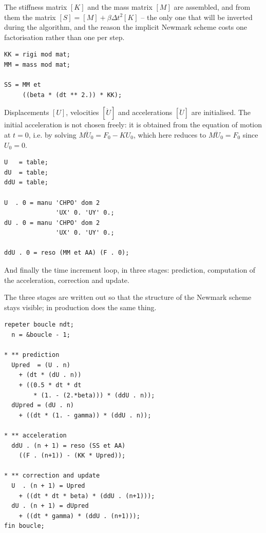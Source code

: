 \begin{castemcom}
The stiffness matrix $[K]$ and the mass matrix $[M]$ are assembled, and from
them the matrix $[S]=[M]+\beta\Delta t^{2}[K]$ -- the only one that will be
inverted during the algorithm, and the reason the implicit Newmark scheme
costs one factorisation rather than one per step.
\end{castemcom}
\begin{castemlines}
\begin{verbatim}
KK = rigi mod mat;
MM = mass mod mat;

SS = MM et
     ((beta * (dt ** 2.)) * KK);
\end{verbatim}
\end{castemlines}

\begin{castemcom}
Displacements $[U]$, velocities $[\dot{U}]$ and accelerations $[\ddot{U}]$ are
initialised. The initial acceleration is not chosen freely: it is obtained
from the equation of motion at $t=0$, i.e. by solving
$M\ddot{U}_0 = F_0 - K U_0$, which here reduces to $M\ddot{U}_0 = F_0$ since
$U_0=0$.
\end{castemcom}
\begin{castemlines}
\begin{verbatim}
U   = table;
dU  = table;
ddU = table;

U  . 0 = manu 'CHPO' dom 2
              'UX' 0. 'UY' 0.;
dU . 0 = manu 'CHPO' dom 2
              'UX' 0. 'UY' 0.;

ddU . 0 = reso (MM et AA) (F . 0);
\end{verbatim}
\end{castemlines}

\begin{castemcom}
And finally the time increment loop, in three stages: prediction, computation
of the acceleration, correction and update.

The three stages are written out so that the structure of the Newmark scheme
stays visible; in production  does the same thing.
\end{castemcom}
\begin{castemlines}
\begin{verbatim}
repeter boucle ndt;
  n = &boucle - 1;

* ** prediction
  Upred  = (U . n)
    + (dt * (dU . n))
    + ((0.5 * dt * dt
        * (1. - (2.*beta))) * (ddU . n));
  dUpred = (dU . n)
    + ((dt * (1. - gamma)) * (ddU . n));

* ** acceleration
  ddU . (n + 1) = reso (SS et AA)
    ((F . (n+1)) - (KK * Upred));

* ** correction and update
  U  . (n + 1) = Upred
    + ((dt * dt * beta) * (ddU . (n+1)));
  dU . (n + 1) = dUpred
    + ((dt * gamma) * (ddU . (n+1)));
fin boucle;
\end{verbatim}
\end{castemlines}

